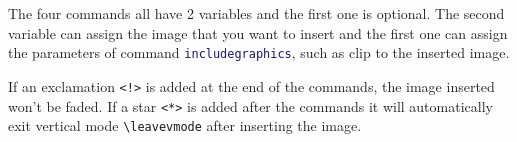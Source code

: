 \documentclass[11pt,svgnames]{article}
\def\cmd#1{\textcolor{MidnightBlue}{\texttt{\string#1}}}
\begin{document}
The four commands all have 2 variables and the first one is optional. The second variable can assign the image that you want to insert and the first one can assign the parameters of command \cmd{includegraphics}, such as clip to the inserted image.

If an exclamation \verb|<!>| is added at the end of the commands, the image inserted won't be faded. If a star \verb|<*>| is added after the commands it will automatically exit vertical mode \verb|\leavevmode| after inserting the image.
\end{document}
